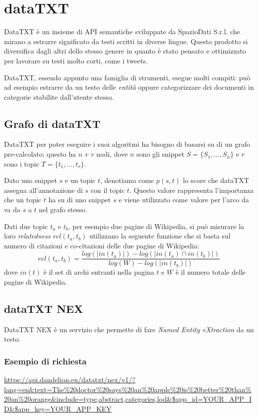 \section{dataTXT}
DataTXT è un insieme di API semantiche sviluppate da SpazioDati S.r.l. che mirano a estrarre significato da testi scritti in diverse lingue. Questo prodotto si diversifica dagli altri dello stesso genere in quanto è stato pensato e ottimizzato per lavorare su testi molto corti, come i tweets.

DataTXT, essendo appunto una famiglia di strumenti, esegue molti compiti: può ad esempio estrarre da un testo delle \emph{entità} oppure categorizzare dei documenti in categorie stabilite dall'utente stesso.

\subsection{Grafo di dataTXT}
	DataTXT per poter eseguire i suoi algoritmi ha bisogno di basarsi su di un grafo pre-calcolato; questo ha $n+r$ nodi, dove $n$ sono gli snippet $S =  \{S_1, ..., S_n\}$ e $r$ sono i topic $T = \{t_1, ..., t_r\}$. 

Dato uno snippet $s$ e un topic $t$, denotiamo come $p(s,t)$ lo score che dataTXT assegna all'annotazione di $s$ con il topic $t$. Questo valore rappresenta l'importanza che un topic $t$ ha su di uno snippet $s$ e viene utilizzato come valore per l'arco da va da $s$ a $t$ nel grafo stesso.

	Dati due topic $t_a$ e $t_b$, per esempio due pagine di Wikipedia, si può misurare la loro \emph{relatedness} $rel(t_a, t_b)$ utilizzano la seguente funzione che si basta sul numero di citazioni e co-citazioni delle due pagine di Wikipedia:
	\begin{equation*}
	  rel(t_a, t_b) = \frac{log(| in(t_a) |) - log(| in(t_a) \cap in(t_b)|)}{log(W) - log(|in(t_b)|)}
	\end{equation*}
	dove $in(t)$ è il set di archi entranti nella pagina $t$ e $W$ è il numero totale delle pagine di Wikipedia\cite{datatxt_graph}.

\subsection{dataTXT NEX}
	DataTXT NEX è un servizio che permette di fare \emph{Named Entity eXtraction} da un 	testo. 

	\subsubsection{Esempio di richiesta}
		\url{https://api.dandelion.eu/datatxt/nex/v1/?lang=en&text=The%20doctor%20says%20an%20apple%20is%20better%20than%20an%20orange&include=type,abstract,categories,lod&$app_id=YOUR_APP_ID&$app_key=YOUR_APP_KEY}
